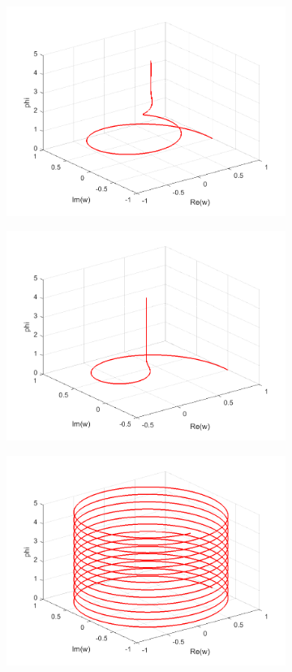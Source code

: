 \documentclass[a4paper,11pt]{article}
\begin{document}
\begin{figure}[!h]
\begin{subfigure}[c]{0.3\textwidth}
\includegraphics[width=\linewidth]{plot7_musg31.png}
\end{subfigure}
\begin{subfigure}[c]{0.3\textwidth}
\includegraphics[width=\linewidth]{plot7_musg32.png}
\end{subfigure}
\begin{subfigure}[c]{0.3\textwidth}
\includegraphics[width=\linewidth]{plot7_musg40.png}

\end{subfigure}
\end{figure}
\end{document}

